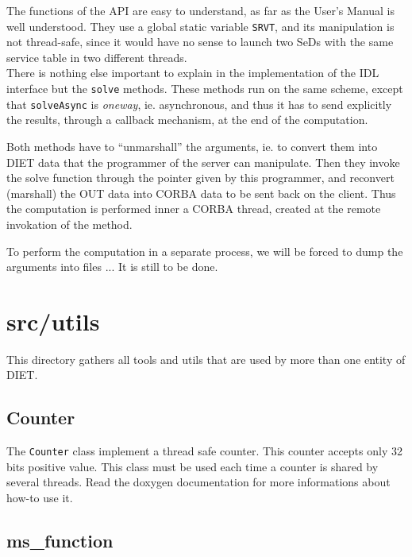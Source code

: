 The functions of the API are easy to understand, as far as the User's Manual is
well understood. They use a global static variable \texttt{SRVT}, and its
manipulation is not thread-safe, since it would have no sense to launch two SeDs
with the same service table in two different threads.
\\

There is nothing else important to explain in the implementation of the IDL
interface but the \texttt{solve} methods. These methods run on the same
scheme, except that \texttt{solveAsync} is \textit{oneway}, ie. asynchronous,
and thus it has to send explicitly the results, through a callback mechanism, at
the end of the computation.


Both methods have to ``unmarshall'' the arguments, ie. to convert them into DIET
data that the programmer of the server can manipulate. Then they invoke the
solve function through the pointer given by this programmer, and reconvert
(marshall) the OUT data into CORBA data to be sent back on the client. Thus the
computation is performed inner a CORBA thread, created at the remote invokation
of the method.

To perform the computation in a separate process, we will be forced to dump the
arguments into files ... It is still to be done.


\section{\textsf{src/utils}}
\label{s:utils}

This directory gathers all tools and utils that are used by more than one
entity of DIET.


\subsection{\textsf{Counter}}

The \texttt{Counter} class implement a thread safe counter. This counter
accepts only 32 bits positive value. This class must be used each time a
counter is shared by several threads. Read the doxygen documentation for more
informations about how-to use it.

\subsection{\textsf{ms\_function}}

